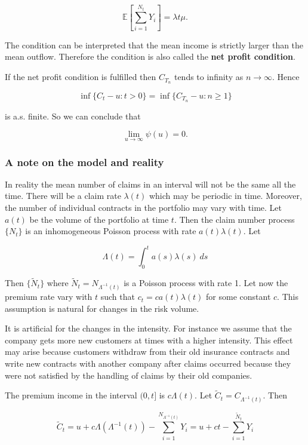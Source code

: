 \documentclass[a4paper,10pt,openany]{book}
\begin{document}
\[
\mathbb E\left[\sum_{i=1}^{N_t}Y_i \right]=\lambda t\mu.
\]

The condition can be interpreted that the mean income is strictly larger than the mean outflow. Therefore the condition is also called the \textbf{net profit condition}.

If the net profit condition is fulfilled then \(C_{T_n}\) tends to infinity as \(n \to\infty\). Hence

\[
\inf\{C_t-u : t>0\}=\inf \{C_{T_n}-u : n\ge 1\}
\]

is a.s. finite. So we can conclude that

\[
\lim_{u\to\infty}\psi(u)=0.
\]

\hypertarget{a-note-on-the-model-and-reality}{%
\subsubsection{A note on the model and reality}\label{a-note-on-the-model-and-reality}}

In reality the mean number of claims in an interval will not be the same all the time. There will be a claim rate \(\lambda(t)\) which may be periodic in time. Moreover, the number of individual contracts in the portfolio may vary with time. Let \(a(t)\) be the volume of the portfolio at time \(t\). Then the claim number process \(\{N_t\}\) is an inhomogeneous Poisson process with rate \(a(t)\lambda(t)\). Let

\[
\Lambda (t)=\int_0^t a(s)\lambda(s)\ ds
\]

Then \(\{\tilde N_t\}\) where \(\tilde N_t = N_{\Lambda^{−1}(t)}\) is a Poisson process with rate 1. Let now the premium rate vary with \(t\) such that \(c_t = ca(t)\lambda(t)\) for some constant \(c\). This assumption is natural for changes in the risk volume.

It is artificial for the changes in the intensity. For instance we assume that the company gets more new customers at times with a higher intensity. This effect may arise because customers withdraw from their old insurance contracts and write new contracts with another company after claims occurred because they were not satisfied by the handling of claims by their old companies.

The premium income in the interval \((0,t]\) is \(c\Lambda(t)\). Let \(\tilde C_t = C_{\Lambda^{−1}(t)}\). Then

\[
\tilde C_t=u+c\Lambda(\Lambda^{-1}(t))-\sum_{i=1}^{N_{\Lambda^{-1}(t)}}Y_i=u+ct-\sum_{i=1}^{\tilde N_t}Y_i
\]
\end{document}
